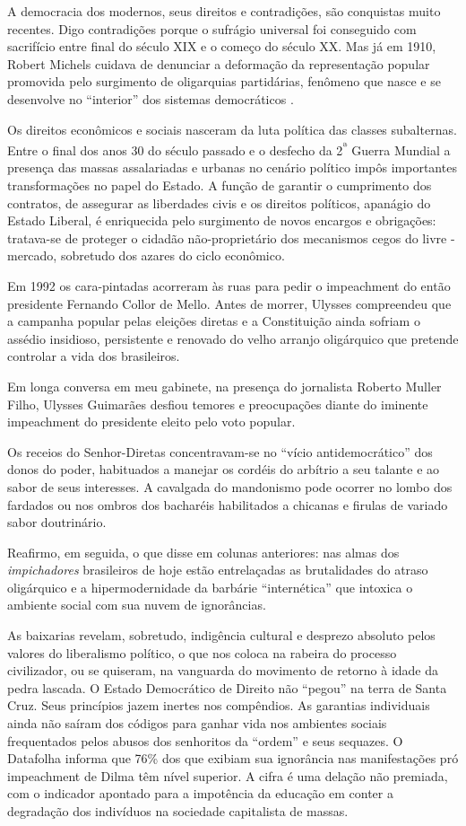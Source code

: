 A democracia dos modernos, seus direitos e contradições, são conquistas
muito recentes. Digo contradições porque o sufrágio universal foi
conseguido com sacrifício entre final do século XIX e o começo do século
XX. Mas já em 1910, Robert Michels cuidava de denunciar a deformação da
representação popular promovida pelo surgimento de oligarquias
partidárias, fenômeno que nasce e se desenvolve no ``interior'' dos
sistemas democráticos .

Os direitos econômicos e sociais nasceram da luta política das classes
subalternas. Entre o final dos anos 30 do século passado e o desfecho da
2\textsuperscript{ª} Guerra Mundial a presença das massas assalariadas e
urbanas no cenário político impôs importantes transformações no papel do
Estado. A função de garantir o cumprimento dos contratos, de assegurar
as liberdades civis e os direitos políticos, apanágio do Estado Liberal,
é enriquecida pelo surgimento de novos encargos e obrigações: tratava-se
de proteger o cidadão não-proprietário dos mecanismos cegos do livre -
mercado, sobretudo dos azares do ciclo econômico.

Em 1992 os cara-pintadas acorreram às ruas para pedir o impeachment do
então presidente Fernando Collor de Mello. Antes de morrer, Ulysses
compreendeu que a campanha popular pelas eleições diretas e a
Constituição ainda sofriam o assédio insidioso, persistente e renovado
do velho arranjo oligárquico que pretende controlar a vida dos
brasileiros.

Em longa conversa em meu gabinete, na presença do jornalista Roberto
Muller Filho, Ulysses Guimarães desfiou temores e preocupações diante do
iminente impeachment do presidente eleito pelo voto popular.

Os receios do Senhor-Diretas concentravam-se no ``vício
antidemocrático'' dos donos do poder, habituados a manejar os cordéis do
arbítrio a seu talante e ao sabor de seus interesses. A cavalgada do
mandonismo pode ocorrer no lombo dos fardados ou nos ombros dos
bacharéis habilitados a chicanas e firulas de variado sabor doutrinário.

Reafirmo, em seguida, o que disse em colunas anteriores: nas almas dos
\emph{impichadores} brasileiros de hoje estão entrelaçadas as
brutalidades do atraso oligárquico e a hipermodernidade da barbárie
``internética'' que intoxica o ambiente social com sua nuvem de
ignorâncias.

As baixarias revelam, sobretudo, indigência cultural e desprezo absoluto
pelos valores do liberalismo político, o que nos coloca na rabeira do
processo civilizador, ou se quiseram, na vanguarda do movimento de
retorno à idade da pedra lascada. O Estado Democrático de Direito não
``pegou'' na terra de Santa Cruz. Seus princípios jazem inertes nos
compêndios. As garantias individuais ainda não saíram dos códigos para
ganhar vida nos ambientes sociais frequentados pelos abusos dos
senhoritos da ``ordem'' e seus sequazes. O Datafolha informa que 76\%
dos que exibiam sua ignorância nas manifestações pró impeachment de
Dilma têm nível superior. A cifra é uma delação não premiada, com o
indicador apontado para a impotência da educação em conter a degradação
dos indivíduos na sociedade capitalista de massas.


